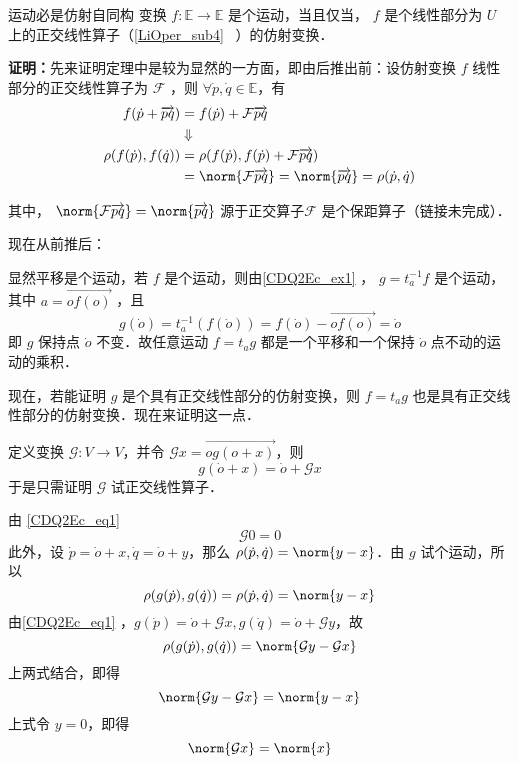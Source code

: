 \begin{theorem}{运动必是仿射自同构}
变换 $f:\mathbb E\rightarrow\mathbb E$ 是个运动，当且仅当， $f$ 是个线性部分为 $U$ 上的正交线性算子（\autoref{LiOper_sub4}~ ）的仿射变换．
\end{theorem}
\textbf{证明：}先来证明定理中是较为显然的一方面，即由后推出前：设仿射变换 $f$ 线性部分的正交线性算子为 $\mathcal F$ ，则 $\forall \dot p,\dot q\in\mathbb E$，有
\begin{equation}
\begin{aligned}
f(\dot p+\overrightarrow{pq})&=f(\dot p)+\mathcal F\overrightarrow{pq}\\
&\Downarrow\\
\rho(f(\dot p),f(\dot q))&=\rho(f(\dot p),f(\dot p)+\mathcal F\overrightarrow{pq})\\
&=\norm{\mathcal F\overrightarrow{pq}}=\norm{\overrightarrow{pq}}=\rho(\dot p,\dot q)
\end{aligned}
\end{equation}

其中， $\norm{\mathcal F\overrightarrow{pq}}=\norm{\overrightarrow{pq}}$ 源于正交算子$\mathcal F$ 是个保距算子（链接未完成）．

现在从前推后：

显然平移是个运动，若 $f$ 是个运动，则由\autoref{CDQ2Ec_ex1} ， $g=t_a^{-1} f$ 是个运动，其中 $a=\overrightarrow{of(o)}$ ，且
\begin{equation}
g(\dot o)=t_a^{-1}(f(\dot o))=f(\dot o)-\overrightarrow{of(o)}=\dot o
\end{equation}
即 $g$ 保持点 $\dot o$ 不变．故任意运动 $f=t_ag$ 都是一个平移和一个保持 $\dot o$ 点不动的运动的乘积．

现在，若能证明 $g$ 是个具有正交线性部分的仿射变换，则 $f=t_a g$ 也是具有正交线性部分的仿射变换．现在来证明这一点．

定义变换 $\mathcal G:V\rightarrow V$，并令 $\mathcal G x=\overrightarrow{og(o+x)}$，则
\begin{equation}\label{CDQ2Ec_eq1}
g(\dot o+x)=\dot o+\mathcal G x
\end{equation}
于是只需证明 $\mathcal G$ 试正交线性算子．

由 \autoref{CDQ2Ec_eq1} 
\begin{equation}
\mathcal G 0=0
\end{equation}
此外，设 $\dot p=\dot o+x,\dot q=\dot o+y$，那么 $\rho(\dot p,\dot q)=\norm{y-x}$．由 $g$ 试个运动，所以
\begin{equation}
\rho(g(\dot p),g(\dot q))=\rho(\dot p,\dot q)=\norm{y-x}
\end{equation}
由\autoref{CDQ2Ec_eq1} ，$g(\dot p)=\dot o+\mathcal G x, g(\dot q)=\dot o+\mathcal G y$，故
\begin{equation}
\rho(g(\dot p),g(\dot q))=\norm{\mathcal Gy-\mathcal Gx}
\end{equation}
上两式结合，即得
\begin{equation}
\norm{\mathcal Gy-\mathcal Gx}=\norm{y-x}
\end{equation}
上式令 $y=0$，即得
\begin{equation}
\norm{\mathcal G x}=\norm{x}
\end{equation}
